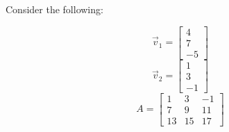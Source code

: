 
Consider the following:

$$\vec{v}_1 = \begin{bmatrix} 4 \\ 7 \\ -5 \end{bmatrix}$$
$$\vec{v}_2 = \begin{bmatrix} 1 \\ 3 \\ -1 \end{bmatrix}$$
$$A = \begin{bmatrix} 1 & 3 & -1 \\7 & 9 & 11 \\13 & 15 & 17 \end{bmatrix}$$

